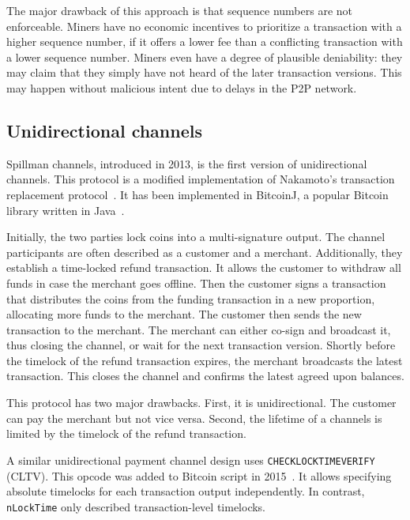 The major drawback of this approach is that sequence numbers are not enforceable.
Miners have no economic incentives to prioritize a transaction with a higher sequence number, if it offers a lower fee than a conflicting transaction with a lower sequence number.
Miners even have a degree of plausible deniability: they may claim that they simply have not heard of the later transaction versions.
This may happen without malicious intent due to delays in the P2P network.


\subsection{Unidirectional channels}

Spillman channels, introduced in 2013, is the first version of unidirectional channels.
This protocol is a modified implementation of Nakamoto's transaction replacement protocol~\cite{Spillman2013}.
It has been implemented in BitcoinJ, a popular Bitcoin library written in Java~\cite{BitcoinJ}.

Initially, the two parties lock coins into a multi-signature output.
The channel participants are often described as a customer and a merchant.
Additionally, they establish a time-locked refund transaction.
It allows the customer to withdraw all funds in case the merchant goes offline.
Then the customer signs a transaction that distributes the coins from the funding transaction in a new proportion, allocating more funds to the merchant.
The customer then sends the new transaction to the merchant. 
The merchant can either co-sign and broadcast it, thus closing the channel, or wait for the next transaction version.
Shortly before the timelock of the refund transaction expires, the merchant broadcasts the latest transaction.
This closes the channel and confirms the latest agreed upon balances.

This protocol has two major drawbacks.
First, it is unidirectional.
The customer can pay the merchant but not vice versa.
Second, the lifetime of a channels is limited by the timelock of the refund transaction.

A similar unidirectional payment channel design uses \texttt{CHECKLOCKTIMEVERIFY} (CLTV).
This opcode was added to Bitcoin script in 2015~\cite{Todd2014}.
It allows specifying absolute timelocks for each transaction output independently.
In contrast, \texttt{nLockTime} only described transaction-level timelocks.

